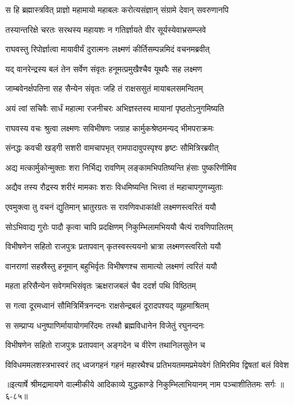 \twolineshloka
{स हि ब्रह्मास्त्रवित् प्राज्ञो महामायो महाबलः}
{करोत्यसंज्ञान् संग्रामे देवान् सवरुणानपि} %

\twolineshloka
{तस्यान्तरिक्षे चरतः सरथस्य महायशः}
{न गतिर्ज्ञायते वीर सूर्यस्येवाभ्रसम्प्लवे} %

\twolineshloka
{राघवस्तु रिपोर्ज्ञात्वा मायावीर्यं दुरात्मनः}
{लक्ष्मणं कीर्तिसम्पन्नमिदं वचनमब्रवीत्} %

\twolineshloka
{यद् वानरेन्द्रस्य बलं तेन सर्वेण संवृतः}
{हनूमत्प्रमुखैश्चैव यूथपैः सह लक्ष्मण} %

\twolineshloka
{जाम्बवेनर्क्षपतिना सह सैन्येन संवृतः}
{जहि तं राक्षससुतं मायाबलसमन्वितम्} %

\twolineshloka
{अयं त्वां सचिवैः सार्धं महात्मा रजनीचरः}
{अभिज्ञस्तस्य मायानां पृष्ठतोऽनुगमिष्यति} %

\twolineshloka
{राघवस्य वचः श्रुत्वा लक्ष्मणः सविभीषणः}
{जग्राह कार्मुकश्रेष्ठमन्यद् भीमपराक्रमः} %

\twolineshloka
{संनद्धः कवची खड्गी सशरी वामचापभृत्}
{रामपादावुपस्पृश्य हृष्टः सौमित्रिरब्रवीत्} %

\twolineshloka
{अद्य मत्कार्मुकोन्मुक्ताः शरा निर्भिद्य रावणिम्}
{लङ्कामभिपतिष्यन्ति हंसाः पुष्करिणीमिव} %

\twolineshloka
{अद्यैव तस्य रौद्रस्य शरीरं मामकाः शराः}
{विधमिष्यन्ति भित्त्वा तं महाचापगुणच्युताः} %

\twolineshloka
{एवमुक्त्वा तु वचनं द्युतिमान् भ्रातुरग्रतः}
{स रावणिवधाकांक्षी लक्ष्मणस्त्वरितं ययौ} %

\twolineshloka
{सोऽभिवाद्य गुरोः पादौ कृत्वा चापि प्रदक्षिणम्}
{निकुम्भिलामभिययौ चैत्यं रावणिपालितम्} %

\twolineshloka
{विभीषणेन सहितो राजपुत्रः प्रतापवान्}
{कृतस्वस्त्ययनो भ्रात्रा लक्ष्मणस्त्वरितो ययौ} %

\twolineshloka
{वानराणां सहस्रैस्तु हनूमान् बहुभिर्वृतः}
{विभीषणश्च सामात्यो लक्ष्मणं त्वरितं ययौ} %

\twolineshloka
{महता हरिसैन्येन सवेगमभिसंवृतः}
{ऋक्षराजबलं चैव ददर्श पथि विष्ठितम्} %

\twolineshloka
{स गत्वा दूरमध्वानं सौमित्रिर्मित्रनन्दनः}
{राक्षसेन्द्रबलं दूरादपश्यद् व्यूहमाश्रितम्} %

\twolineshloka
{स सम्प्राप्य धनुष्पाणिर्मायायोगमरिंदमः}
{तस्थौ ब्रह्मविधानेन विजेतुं रघुनन्दनः} %

\twolineshloka
{विभीषणेन सहितो राजपुत्रः प्रतापवान्}
{अङ्गदेन च वीरेण तथानिलसुतेन च} %

\twolineshloka
{विविधममलशस्त्रभास्वरं तद् ध्वजगहनं गहनं महारथैश्च}
{प्रतिभयतममप्रमेयवेगं तिमिरमिव द्विषतां बलं विवेश} %


॥इत्यार्षे श्रीमद्रामायणे वाल्मीकीये आदिकाव्ये युद्धकाण्डे निकुम्भिलाभियानम् नाम पञ्चाशीतितमः सर्गः ॥६-८५॥
